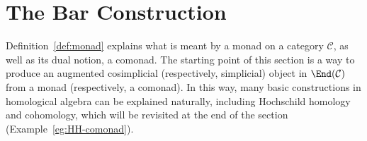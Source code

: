 
\section{The Bar Construction}\label{sec:bar-resolution}
\hypertarget{o014.aljabr2.chapter8.bar-construction-a}{ }
Definition~\ref{def:monad} explains what is meant by a monad on a category
$\mathcal{C}$, as well as its dual notion, a comonad. The starting point of
this section is a way to produce an augmented cosimplicial (respectively,
simplicial) object in $\End(\mathcal{C})$ from a monad (respectively, a
comonad). In this way, many basic constructions in homological algebra can be
explained naturally, including Hochschild homology and cohomology, which will
be revisited at the end of the section (Example~\ref{eg:HH-comonad}).

